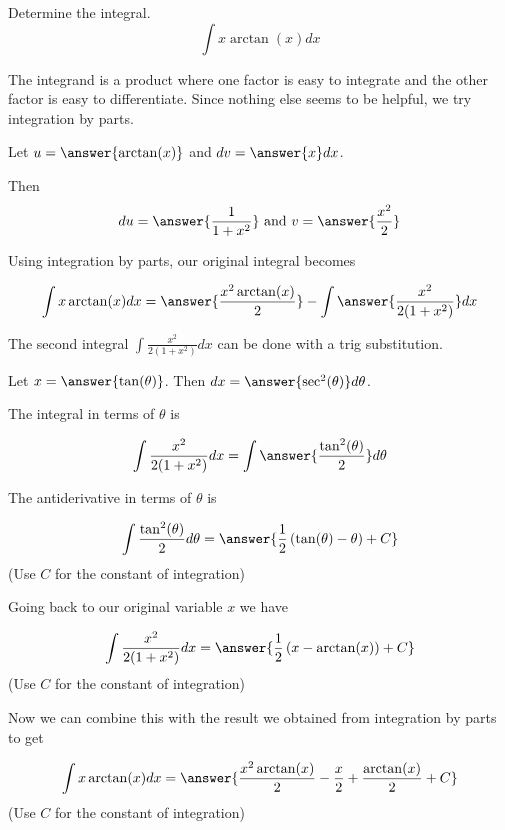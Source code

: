 \documentclass{ximera}
\author{Jason Miller}
\begin{document}
\begin{exercise}
Determine the integral.
\[
\int x\arctan(x) dx
\]


The integrand is a product where one factor is easy to integrate and the other factor is easy to differentiate. Since nothing else seems to be helpful, we try integration by parts. 

Let $u=\answer{ \arctan(x)}$ and $dv= \answer{  x } dx$. 

Then 
\[
  du= \answer{ \frac{1}{1+x^{2}}} \text{ and }  v=\answer{ \frac{x^{2}}{2} }
\]

\begin{exercise}

Using integration by parts, our original integral becomes

\[
\int x\arctan(x) dx=\answer{\frac{x^{2}\arctan(x)}{2}} - \int \answer{\frac{x^{2}}{2(1+x^{2})}} dx
\]

\begin{exercise}

The second integral $\int \frac{x^{2}}{2(1+x^{2})} dx$ can be done with a trig substitution. 

Let $x=\answer{ \tan(\theta)}$. Then $dx=\answer{ \sec^{2}(\theta)} d\theta$.

The integral in terms of $\theta$ is

\[
\int \frac{x^{2}}{2(1+x^{2})} dx =\int \answer{ \frac{\tan^{2}(\theta)}{2}} d\theta
\]

\begin{exercise}
The antiderivative in terms of $\theta$ is

\[
\int \frac{\tan^{2}(\theta)}{2} d\theta=\answer{\frac{1}{2}\left( \tan(\theta) - \theta \right) + C }
\]
(Use $C$ for the constant of integration)

\begin{exercise}
Going back to our original variable $x$ we have 

\[
\int \frac{x^{2}}{2(1+x^{2})} dx=\answer{\frac{1}{2}\left( x-\arctan(x) \right) + C }
\]
(Use $C$ for the constant of integration)

\begin{exercise}

Now we can combine this with the result we obtained from integration by parts to get


\[
\int x\arctan(x) dx=\answer{ \frac{x^{2}\arctan(x)}{2}-\frac{x}{2}+\frac{\arctan(x)}{2} + C}
\]
(Use $C$ for the constant of integration)



\end{exercise}
\end{exercise}

\end{exercise}
\end{exercise}
\end{exercise}
\end{exercise}
\end{document}
